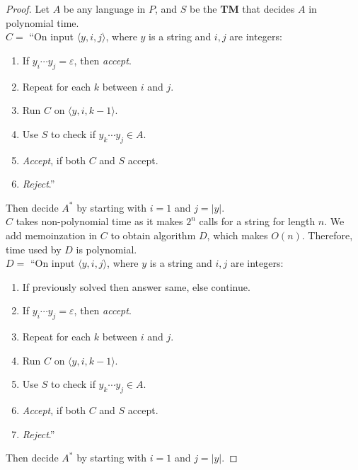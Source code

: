 \documentclass[11pt]{article}
\begin{document}
\begin{proof}Let $A$ be any language in $P$, and $S$ be the \textbf{TM} that decides $A$ in polynomial time. \\

$C =$ \textquotedblleft On input $\langle y, i, j \rangle$, where $y$ is a string and $i, j$ are integers:
\begin{enumerate}
\item If $y_i \cdots y_j = \varepsilon$, then \textit{accept}.
\item Repeat for each $k$ between $i$ and $j$.
\item \hspace*{0.5cm} Run $C$ on $\langle y, i, k - 1 \rangle$.
\item \hspace*{0.5cm} Use $S$ to check if $y_k \cdots y_j \in A$.
\item \hspace*{0.5cm} \textit{Accept}, if both $C$ and $S$ accept.
\item \textit{Reject}.\textquotedblright
\end{enumerate}
Then decide $A^{*}$ by starting with $i=1$ and $j=|y|$. \\

$C$ takes non-polynomial time as it makes $2^{n}$ calls for a string for length $n$. We add memoinzation in $C$ to obtain algorithm $D$, which makes $O(n)$. Therefore, time used by $D$ is polynomial. \\

$D =$ \textquotedblleft On input $\langle y, i, j \rangle$, where $y$ is a string and $i, j$ are integers:
\begin{enumerate}
\item If previously solved then answer same, else continue.
\item If $y_i \cdots y_j = \varepsilon$, then \textit{accept}.
\item Repeat for each $k$ between $i$ and $j$.
\item \hspace*{0.5cm} Run $C$ on $\langle y, i, k - 1 \rangle$.
\item \hspace*{0.5cm} Use $S$ to check if $y_k \cdots y_j \in A$.
\item \hspace*{0.5cm} \textit{Accept}, if both $C$ and $S$ accept.
\item \textit{Reject}.\textquotedblright
\end{enumerate}
Then decide $A^{*}$ by starting with $i=1$ and $j=|y|$.
\end{proof}
\end{document}
